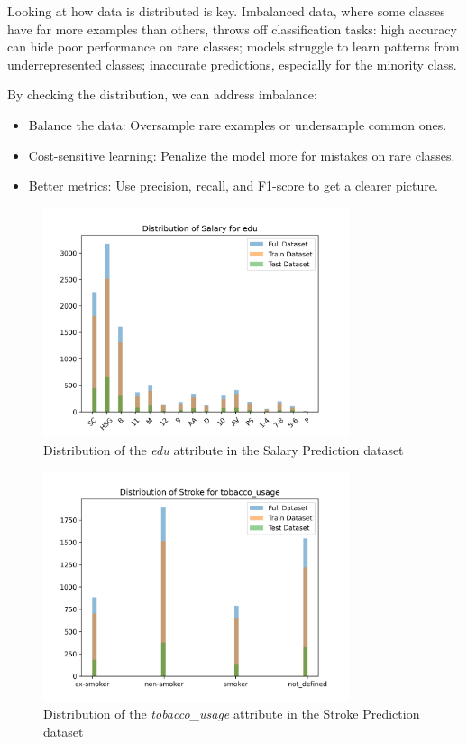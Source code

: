\documentclass[runningheads]{paper}
\begin{document}
Looking at how data is distributed is key. Imbalanced data, where some classes 
have far more examples than others, throws off classification tasks:
high accuracy can hide poor performance on rare classes; models struggle to 
learn patterns from underrepresented classes; inaccurate predictions, especially 
for the minority class.

By checking the distribution, we can address imbalance:
\begin{itemize}
    \item Balance the data: Oversample rare examples or undersample common ones.
    \item Cost-sensitive learning: Penalize the model more for mistakes on rare classes.
    \item Better metrics: Use precision, recall, and F1-score to get a clearer picture.
\end{itemize}

\begin{figure}[H]
    \centering
    \includegraphics[width=0.8\textwidth]{../plots/distribution_edu_Salary_Prediction.png}
    \caption{Distribution of the \textit{edu} attribute in the Salary Prediction dataset}
    \label{fig:distribution_example_salary}
\end{figure}

\begin{figure}[H]
    \centering
    \includegraphics[width=0.8\textwidth]{../plots/distribution_tobacco_usage_Stroke_Prediction.png}
    \caption{Distribution of the \textit{tobacco\_usage} attribute in the Stroke Prediction dataset}
    \label{fig:distribution_example_stroke}
\end{figure}
\end{document}
